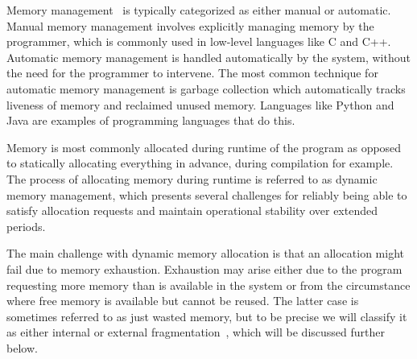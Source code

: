 
Memory management~\cite{gchandbook} is typically categorized as either manual or automatic. Manual memory management involves explicitly managing memory by the programmer, which is commonly used in low-level languages like C and C++. Automatic memory management is handled automatically by the system, without the need for the programmer to intervene. The most common technique for automatic memory management is garbage collection which automatically tracks liveness of memory and reclaimed unused memory. Languages like Python and Java are examples of programming languages that do this.

Memory is most commonly allocated during runtime of the program as opposed to statically allocating everything in advance, during compilation for example. The process of allocating memory during runtime is referred to as dynamic memory management, which presents several challenges for reliably being able to satisfy allocation requests and maintain operational stability over extended periods.

The main challenge with dynamic memory allocation is that an allocation might fail due to memory exhaustion. Exhaustion may arise either due to the program requesting more memory than is available in the system or from the circumstance where free memory is available but cannot be reused. The latter case is sometimes referred to as just wasted memory, but to be precise we will classify it as either internal or external fragmentation~\cite{gchandbook}, which will be discussed further below.

